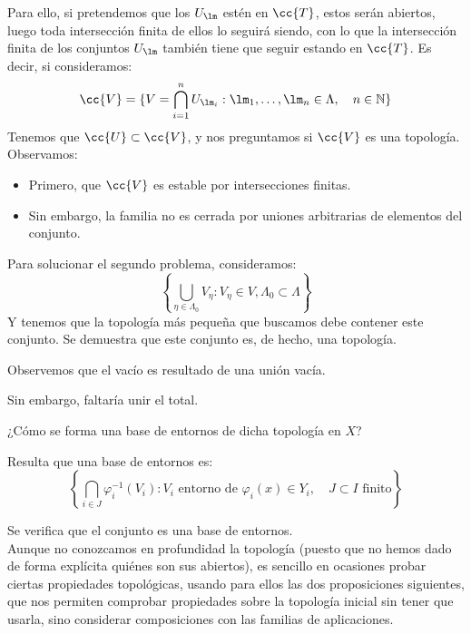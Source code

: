 \noindent
Para ello, si pretendemos que los $U_\lm$ estén en $\cc{T}$, estos serán abiertos, luego toda intersección finita de ellos lo seguirá siendo, con lo que la intersección finita de los conjuntos $U_\lm$ también tiene que seguir estando en $\cc{T}$. Es decir, si consideramos:
\begin{equation*}
    \cc{V} = \{V = \bigcap_{i=1}^n U_{\lm _i} : \lm_1, \ldots, \lm_n \in \Lambda, \quad n\in \mathbb{N}\}
\end{equation*}
Tenemos que $\cc{U}\subset \cc{V}$, y nos preguntamos si $\cc{V}$ es una topología. Observamos:
\begin{itemize}
    \item Primero, que $\cc{V}$ es estable por intersecciones finitas.
    \item Sin embargo, la familia no es cerrada por uniones arbitrarias de elementos del conjunto.
\end{itemize}
Para solucionar el segundo problema, consideramos:
\begin{equation*}
    \left\{\bigcup_{\eta \in \Lambda_0} V_\eta : V_\eta \in V, \Lambda_0\subset \Lambda\right\}
\end{equation*}
Y tenemos que la topología más pequeña que buscamos debe contener este conjunto. Se demuestra que este conjunto es, de hecho, una topología.

\begin{observacion}
    Observemos que el vacío es resultado de una unión vacía.

    Sin embargo, faltaría unir el total.
\end{observacion}

\noindent
¿Cómo se forma una base de entornos de dicha topología en $X$?

Resulta que una base de entornos es:
\begin{equation*}
    \left\{\bigcap_{i \in J}\varphi_i^{-1}(V_i) : V_i \text{\ entorno de\ } \varphi_i(x)\in Y_i, \quad J\subset I \text{\ finito}\right\}
\end{equation*}

\noindent
Se verifica que el conjunto es una base de entornos.\\

\noindent
Aunque no conozcamos en profundidad la topología (puesto que no hemos dado de forma explícita quiénes son sus abiertos), es sencillo en ocasiones probar ciertas propiedades topológicas, usando para ellos las dos proposiciones siguientes, que nos permiten comprobar propiedades sobre la topología inicial sin tener que usarla, sino considerar composiciones con las familias de aplicaciones.

